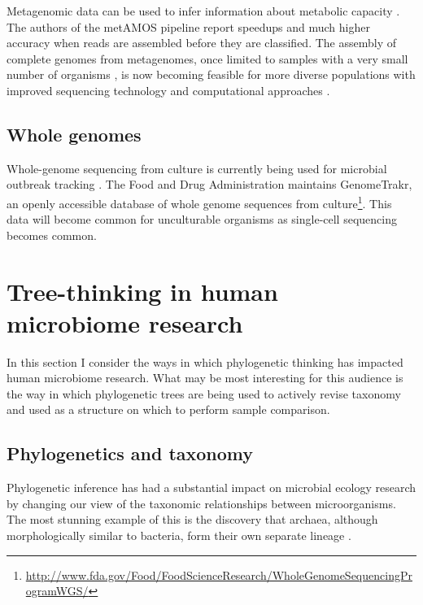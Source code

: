 \documentclass{amsart}
\begin{document}
Metagenomic data can be used to infer information about metabolic capacity \cite{greenblum2012metagenomic,abubucker2012metabolic}.
The authors of the metAMOS pipeline \citep{treangen2013metamos} report speedups and much higher accuracy when reads are assembled before they are classified.
The assembly of complete genomes from metagenomes, once limited to samples with a very small number of organisms \citep{baker2010enigmatic}, is now becoming feasible for more diverse populations with improved sequencing technology and computational approaches \cite{howe2012assembling,pell2012scaling,iverson2012untangling,emerson2012metagenomic,podell2013assembly}.


\subsection{Whole genomes}
Whole-genome sequencing from culture is currently being used for microbial outbreak tracking \citep{koser2012rapid,snitkin2012tracking}.
The Food and Drug Administration maintains GenomeTrakr, an openly accessible database of whole genome sequences from culture\footnote{\url{http://www.fda.gov/Food/FoodScienceResearch/WholeGenomeSequencingProgramWGS/}}.
This data will become common for unculturable organisms as single-cell sequencing \citep[reviewed in][]{kalisky2011single} becomes common.




\section{Tree-thinking in human microbiome research}

In this section I consider the ways in which phylogenetic thinking has impacted human microbiome research.
What may be most interesting for this audience is the way in which phylogenetic trees are being used to actively revise taxonomy and used as a structure on which to perform sample comparison.

\subsection{Phylogenetics and taxonomy}

Phylogenetic inference has had a substantial impact on microbial ecology research by changing our view of the taxonomic relationships between microorganisms.
The most stunning example of this is the discovery that archaea, although morphologically similar to bacteria, form their own separate lineage \citep{woese1977phylogenetic}.
\end{document}
